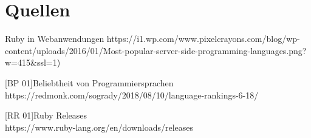 \documentclass[12pt,DIV=14, version=first, BCOR=10mm,a4paper,twoside,parskip=half-,headsepline,headinclude]{scrartcl}
\begin{document}
\section{Quellen}
\begin{flushleft}
[RW 01]Ruby in Webanwendungen
https://i1.wp.com/www.pixelcrayons.com/blog/wp-content/uploads/2016/01/Most-popular-server-side-programming-languages.png?w=415{\&}ssl=1)

[BP 01]Beliebtheit von Programmiersprachen
https://redmonk.com/sogrady/2018/08/10/language-rankings-6-18/

[RR 01]Ruby Releases\\
https://www.ruby-lang.org/en/downloads/releases
\end{flushleft}


%
\end{document}
